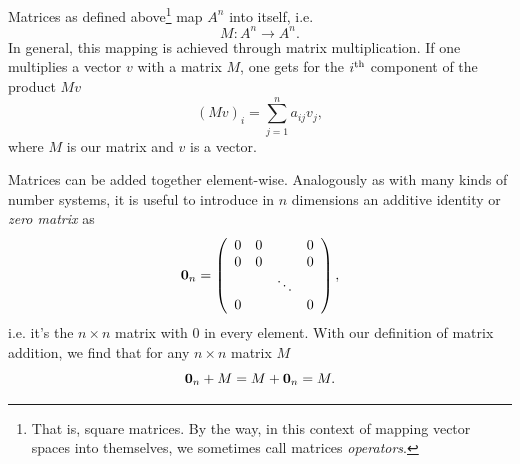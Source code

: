 Matrices as defined above\footnote{That is, square matrices. By the way,
in this context of mapping vector spaces into themselves, we sometimes
call matrices {\it operators}.} map $A^n$ into itself, i.e.
\begin{equation}\label{eq:operatorDef}
  M:A^n\to A^n.
\end{equation}
In general, this mapping is achieved through matrix multiplication. If one
multiplies a vector $v$ with a matrix $M$, one gets for the $i{}^{\rm th}$ component
of the product $Mv$
\begin{equation}\label{eq:matTimesVec}
  (Mv)_i=\sum_{j=1}^n a_{ij}v_j,
\end{equation}
where $M$ is our matrix and $v$ is a vector.

Matrices can be added together element-wise.
Analogously as with many kinds of number systems, it is useful to introduce
in $n$ dimensions an additive identity or {\it zero matrix} as
\begin{equation}
  {\mathbf 0}_n=\left(\begin{array}{cccc}
          0   & 0 &       & 0\\
          0   & 0 &       & 0\\
              &   & \ddots& \\
          0   &   &       & 0
            \end{array}\right), 
\end{equation}
i.e. it's the $n\times n$ matrix with 0 in every element. With our definition
of matrix addition, we find that for any $n\times n$ matrix $M$
\begin{equation}
{\mathbf 0}_n+M=M+{\mathbf 0}_n=M.
\end{equation}

